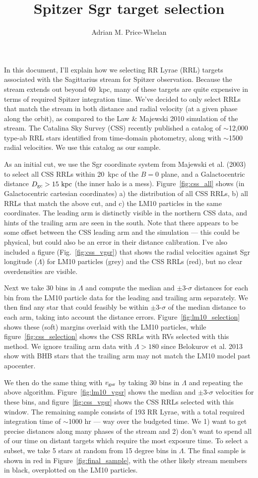 \documentclass[letterpaper,12pt,preprint]{aastex}
\begin{document}
\title{Spitzer Sgr target selection}
\author{Adrian M. Price-Whelan}

In this document, I'll explain how we selecting RR Lyrae (RRL) targets associated with the Sagittarius stream for Spitzer observation. Because the stream extends out beyond 60~kpc, many of these targets are quite expensive in terms of required Spitzer integration time. We've decided to only select RRLs that match the stream in both distance and radial velocity (at a given phase along the orbit), as compared to the Law \& Majewski 2010 simulation of the stream. The Catalina Sky Survey (CSS) recently published a catalog of $\sim$12,000 type-ab RRL stars identified from time-domain photometry, along with $\sim$1500 radial velocities. We use this catalog as our sample.

As an initial cut, we use the Sgr coordinate system from Majewski et al. (2003) to select all CSS RRLs within 20~kpc of the $B=0$ plane, and a Galactocentric distance $D_{\rm gc} > 15~{\rm kpc}$ (the inner halo is a mess). Figure~\ref{fig:css_all} shows (in Galactocentric cartesian coordinates) a) the distribution of all CSS RRLs, b) all RRLs that match the above cut, and c) the LM10 particles in the same coordinates. The leading arm is distinctly visible in the northern CSS data, and hints of the trailing arm are seen in the south. Note that there appears to be some offset between the CSS leading arm and the simulation --- this could be physical, but could also be an error in their distance calibration. I've also included a figure (Fig.~\ref{fig:css_vgsr}) that shows the radial velocities against Sgr longitude ($\Lambda$) for LM10 particles (grey) and the CSS RRLs (red), but no clear overdensities are visible.

Next we take 30 bins in $\Lambda$ and compute the median and $\pm$3-$\sigma$ distances for each bin from the LM10 particle data for the leading and trailing arm separately. We then find any star that could feasibly be within $\pm$3-$\sigma$ of the median distance to each arm, taking into account the distance errors. Figure~\ref{fig:lm10_selection} shows these (soft) margins overlaid with the LM10 particles, while figure~\ref{fig:css_selection} shows the CSS RRLs with RVs selected with this method. We ignore trailing arm data with $\Lambda>180$ since Belokurov et al. 2013 show with BHB stars that the trailing arm may not match the LM10 model past apocenter.

We then do the same thing with $v_{\rm gsr}$ by taking 30 bins in $\Lambda$ and repeating the above algorithm. Figure~\ref{fig:lm10_vgsr} shows the median and $\pm$3-$\sigma$ velocities for these bins, and figure~\ref{fig:css_vgsr} shows the CSS RRLs selected with this window. The remaining sample consists of 193 RR Lyrae, with a total required integration time of $\sim$1000 hr --- way over the budgeted time. We 1) want to get precise distances along many phases of the stream and 2) don't want to spend all of our time on distant targets which require the most exposure time. To select a subset, we take 5 stars at random from 15 degree bins in $\Lambda$. The final sample is shown in red in Figure~\ref{fig:final_sample}, with the other likely stream members in black, overplotted on the LM10 particles. 
\end{document}
